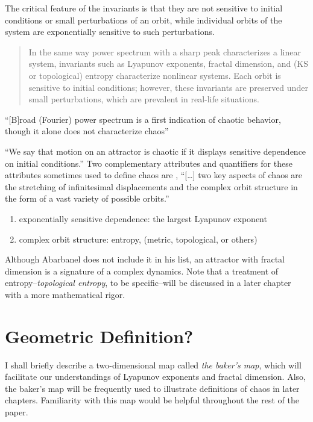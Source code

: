 \documentclass[12pt,twoside]{book}
\begin{document}
The critical feature of the invariants is that they are not sensitive to initial conditions
or small perturbations of an orbit, while individual orbits of the system are exponentially
sensitive to such perturbations. \citep[p.1334]{abarbanel}

\begin{quote}
In the same way power spectrum with a sharp peak characterizes a linear system, invariants such as Lyapunov exponents, fractal dimension, and (KS or topological) entropy characterize nonlinear systems.
Each orbit is sensitive to initial conditions; however, these invariants are preserved under small perturbations, which are prevalent in real-life situations.
\end{quote}

``[B]road (Fourier) power spectrum is a first indication of chaotic behavior, though it alone does not characterize chaos''\citep[p.1338]{abarbanel}

``We say that motion on an attractor is chaotic if it displays sensitive dependence on initial conditions.'' \citep[p.11]{ott1994}
Two complementary attributes and quantifiers for these attributes sometimes used to define chaos are \citep[p.379]{abarbanel}, %
``[\ldots] two key aspects of chaos are the stretching of infinitesimal displacements and the complex orbit structure in the form of a vast variety of possible orbits.'' \citep[p.31]{ott1994}
\begin{enumerate}
  \item exponentially sensitive dependence: the largest Lyapunov exponent 
  \item complex orbit structure: entropy, (metric, topological, or others)
\end{enumerate}

Although Abarbanel does not include it in his list, an attractor with fractal dimension is a signature of a complex dynamics.
Note that a treatment of entropy--\textit{topological entropy}, to be specific--will be discussed in a later chapter with a more mathematical rigor.

\section{Geometric Definition?}
I shall briefly describe a two-dimensional map called \textit{the baker's map}, which will facilitate our understandings of Lyapunov exponents and fractal dimension.
Also, the baker's map will be frequently used to illustrate definitions of chaos in later chapters.
Familiarity with this map would be helpful throughout the rest of the paper.
\end{document}
